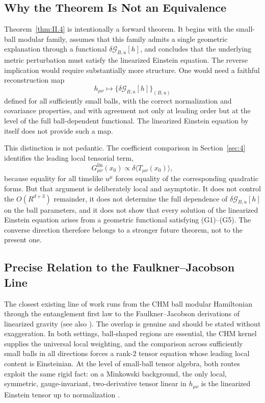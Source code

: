 \documentclass[12pt]{article}
\theoremstyle{definition}
\theoremstyle{remark}
\begin{document}
\subsection{Why the Theorem Is Not an Equivalence}\label{subsec:6.1}

Theorem~\ref{thm:II.4} is intentionally a forward theorem. It begins with the small-ball modular family, assumes that this family admits a single geometric explanation through a functional \(\delta\mathcal{G}_{B,u}[h]\), and concludes that the underlying metric perturbation must satisfy the linearized Einstein equation. The reverse implication would require substantially more structure. One would need a faithful reconstruction map
\[
h_{\mu\nu}
\longmapsto
\{\delta\mathcal{G}_{B,u}[h]\}_{(B,u)}
\]
defined for all sufficiently small balls, with the correct normalization and covariance properties, and with agreement not only at leading order but at the level of the full ball-dependent functional. The linearized Einstein equation by itself does not provide such a map.

This distinction is not pedantic. The coefficient comparison in Section~\ref{sec:4} identifies the leading local tensorial term,
\[
G^{\mathrm{lin}}_{\mu\nu}(x_0)
\propto
\delta\langle T_{\mu\nu}(x_0)\rangle,
\]
because equality for all timelike \(u^\mu\) forces equality of the corresponding quadratic forms. But that argument is deliberately local and asymptotic. It does not control the \(O(R^{d+3})\) remainder, it does not determine the full dependence of \(\delta\mathcal{G}_{B,u}[h]\) on the ball parameters, and it does not show that every solution of the linearized Einstein equation arises from a geometric functional satisfying (G1)--(G5). The converse direction therefore belongs to a stronger future theorem, not to the present one.

\subsection{Precise Relation to the Faulkner--Jacobson Line}\label{subsec:6.2}

The closest existing line of work runs from the CHM ball modular Hamiltonian through the entanglement first law to the Faulkner\cite{Faulkner2014}--Jacobson\cite{Jacobson2016} derivations of linearized gravity (see also \cite{Lashkari2014}). The overlap is genuine and should be stated without exaggeration. In both settings, ball-shaped regions are essential, the CHM kernel supplies the universal local weighting, and the comparison across sufficiently small balls in all directions forces a rank-2 tensor equation whose leading local content is Einsteinian. At the level of small-ball tensor algebra, both routes exploit the same rigid fact: on a Minkowski background, the only local, symmetric, gauge-invariant, two-derivative tensor linear in \(h_{\mu\nu}\) is the linearized Einstein tensor up to normalization \cite{Lovelock1971}.
\end{document}
